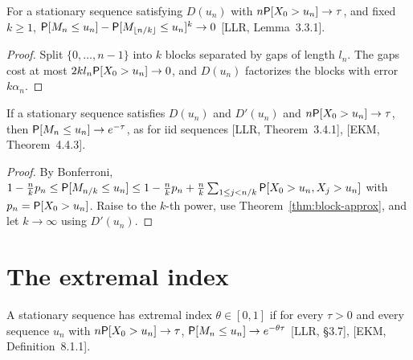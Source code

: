 \begin{theorem}
  \label{thm:block-approx}
  \leanok
  For a stationary sequence satisfying $D(u_n)$ with $n \mathsf{P}[X_0 > u_n] \to \tau$, and fixed
  $k \ge 1$, $\mathsf{P}[M_n \le u_n] - \mathsf{P}[M_{\lfloor n/k \rfloor} \le u_n]^k \to 0$ [LLR, Lemma~3.3.1].
\end{theorem}
\begin{proof}
  \leanok
  Split $\{0, \dots, n-1\}$ into $k$ blocks separated by gaps of length $l_n$. The gaps cost at most
  $2 k l_n \mathsf{P}[X_0 > u_n] \to 0$, and $D(u_n)$ factorizes the blocks with error $k \alpha_n$.
\end{proof}

\begin{theorem}
  \label{thm:leadbetter}
  \leanok
  If a stationary sequence satisfies $D(u_n)$ and $D'(u_n)$ and $n \mathsf{P}[X_0 > u_n] \to \tau$, then
  $\mathsf{P}[M_n \le u_n] \to e^{-\tau}$, as for iid sequences [LLR, Theorem~3.4.1], [EKM, Theorem~4.4.3].
\end{theorem}
\begin{proof}
  \leanok
  By Bonferroni, $1 - \frac{n}{k} p_n \le \mathsf{P}[M_{n/k} \le u_n] \le 1 - \frac{n}{k} p_n + \frac{n}{k}
  \sum_{1 \le j < n/k} \mathsf{P}[X_0 > u_n, X_j > u_n]$ with $p_n = \mathsf{P}[X_0 > u_n]$. Raise to the $k$-th
  power, use Theorem~\ref{thm:block-approx}, and let $k \to \infty$ using $D'(u_n)$.
\end{proof}

\section{The extremal index}

\begin{definition}
  \label{def:extremal-index}
  \leanok
  A stationary sequence has extremal index $\theta \in [0, 1]$ if for every $\tau > 0$ and every
  sequence $u_n$ with $n \mathsf{P}[X_0 > u_n] \to \tau$, $\mathsf{P}[M_n \le u_n] \to e^{-\theta\tau}$
  [LLR, \S3.7], [EKM, Definition~8.1.1].
\end{definition}

